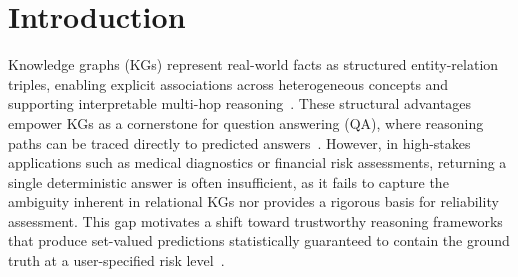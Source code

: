 \documentclass{article}
\newcommand{\jy}[1]{\textcolor{red}{[JY: #1]}}
\theoremstyle{plain}
\theoremstyle{definition}
\theoremstyle{remark}
\begin{document}
    
    


\section{Introduction}
\label{sec:intro}

Knowledge graphs (KGs) represent real-world facts as structured entity-relation triples, enabling explicit associations across heterogeneous concepts and supporting interpretable multi-hop reasoning~\cite{KG2021survey, guo2025reagan}. These structural advantages empower KGs as a cornerstone for question answering (QA), where reasoning paths can be traced directly to predicted answers~\cite{KGQA_Survey,KG_ReasoningSurvey}. However, in high-stakes applications such as medical diagnostics or financial risk assessments, returning a single deterministic answer is often insufficient, as it fails to capture the ambiguity inherent in relational KGs nor provides a rigorous basis for reliability assessment. This gap motivates a shift toward trustworthy reasoning frameworks that produce set-valued predictions statistically guaranteed to contain the ground truth at a user-specified risk level~\cite{li-etal-2024-traq,memmesheimer2025systematic}.

\end{document}
